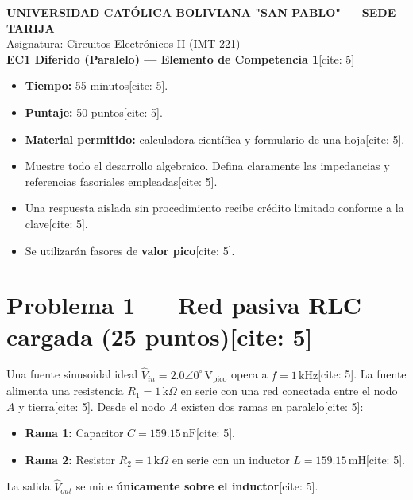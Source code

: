 \documentclass[11pt, a4paper]{article}
\begin{document}
\begin{center}
    \Large\textbf{\textcolor{ucbblue}{UNIVERSIDAD CATÓLICA BOLIVIANA "SAN PABLO" — SEDE TARIJA}}\\
    \vspace{0.2cm}
    \normalsize Asignatura: Circuitos Electrónicos II (IMT-221) \\
    \textbf{EC1 Diferido (Paralelo) — Elemento de Competencia 1}[cite: 5]
\end{center}

\vspace{0.2cm}
\begin{tcolorbox}[colback=ucbblue!5!white, colframe=ucbblue, title=\textbf{Condiciones de la Evaluación}]
    \begin{itemize}
        \item \textbf{Tiempo:} 55 minutos[cite: 5].
        \item \textbf{Puntaje:} 50 puntos[cite: 5].
        \item \textbf{Material permitido:} calculadora científica y formulario de una hoja[cite: 5].
        \item Muestre todo el desarrollo algebraico. Defina claramente las impedancias y referencias fasoriales empleadas[cite: 5].
        \item Una respuesta aislada sin procedimiento recibe crédito limitado conforme a la clave[cite: 5].
        \item Se utilizarán fasores de \textbf{valor pico}[cite: 5].
    \end{itemize}
\end{tcolorbox}

\vspace{0.4cm}
\section*{Problema 1 — Red pasiva RLC cargada (25 puntos)[cite: 5]}
Una fuente sinusoidal ideal $\hat V_{in} = 2.0\angle0^\circ\,\text{V}_{\text{pico}}$ opera a $f = 1\,\text{kHz}$[cite: 5]. La fuente alimenta una resistencia $R_1 = 1\,\text{k}\Omega$ en serie con una red conectada entre el nodo $A$ y tierra[cite: 5]. Desde el nodo $A$ existen dos ramas en paralelo[cite: 5]:
\begin{itemize}
    \item \textbf{Rama 1:} Capacitor $C = 159.15\,\text{nF}$[cite: 5].
    \item \textbf{Rama 2:} Resistor $R_2 = 1\,\text{k}\Omega$ en serie con un inductor $L = 159.15\,\text{mH}$[cite: 5].
\end{itemize}
La salida $\hat V_{out}$ se mide \textbf{únicamente sobre el inductor}[cite: 5].
\end{document}
